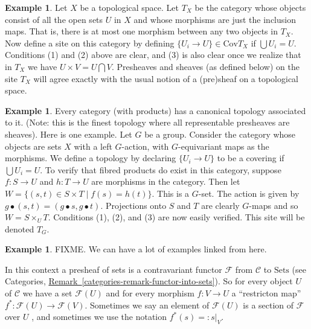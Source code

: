 \documentclass{amsart}
\theoremstyle{definition}
\newtheorem{example}[theorem]{Example}
\theoremstyle{remark}
\numberwithin{equation}{subsection}
\begin{document}
\begin{example}
Let $X$ be a topological space.  Let $T_X$ be the category whose
objects consist of all the open sets $U$ in $X$ and whose morphisms
are just the inclusion maps.  That is, there is at most one morphism
between any two objects in $T_X$.  Now define a site on this
category by defining $\{U_i \to U\}\in \text{Cov} T_X$ if $\bigcup
U_i = U$. Conditions (1) and (2) above are clear, and (3) is also
clear once we realize that in $T_X$ we have $U \times V = U \bigcap V$.
Presheaves and sheaves (as defined below) on the site $T_X$ will
agree exactly with the usual notion of a (pre)sheaf on a topological
space.
\end{example}

\begin{example}
\label{example-site on group} Every category (with products) has a
canonical topology associated to it. (Note: this is the finest
topology where all representable presheaves are sheaves). Here is one
example. Let $G$ be a group. Consider the category whose objects are 
sets $X$ with a left $G$-action, with $G$-equivariant maps as the
morphisms.  We define a topology by declaring $\{U_i \to U\}$ to be 
a covering if $\bigcup U_i = U$. To verify that fibred products do 
exist in this category, suppose $f: S \rightarrow U$ and 
$h: T \rightarrow U$ are morphisms in the category. Then let 
$W = \{(s, t) \in S \times T \mid f(s) = h(t)\}$. This is a $G$-set. 
The action is given by $g \bullet(s,t) = (g \bullet s, g \bullet t)$.
Projections onto $S$ and $T$ are clearly $G$-maps and so 
$W = S \times_U T$.  Conditions (1), (2), and (3) are now easily 
verified. This site will be denoted $T_G$.
\end{example}

\begin{example}
FIXME. We can have a lot of examples linked from here.
\end{example}

\noindent
In this context a presheaf of sets is a contravariant functor
$\mathcal{F}$ from $\mathcal{C}$ to $\text{Sets}$ (see Categories, 
\hyperref[categories-remark-functor-into-sets]%
{Remark~\ref*{categories-remark-functor-into-sets}}). 
So for every object $U$ of $\mathcal{C}$ we have a set 
$\mathcal{F}(U)$ and for every morphism
$f : V \to U$ a ``restricton map'' $f^\ast : \mathcal{F}(U) \to 
\mathcal{F}(V)$. Sometimes we say an element
of $\mathcal{F}(U)$ is a section of $\mathcal{F}$ over $U$ , and sometimes
we use the notation $f^\ast(s) =: s|_V$. 
\end{document}
